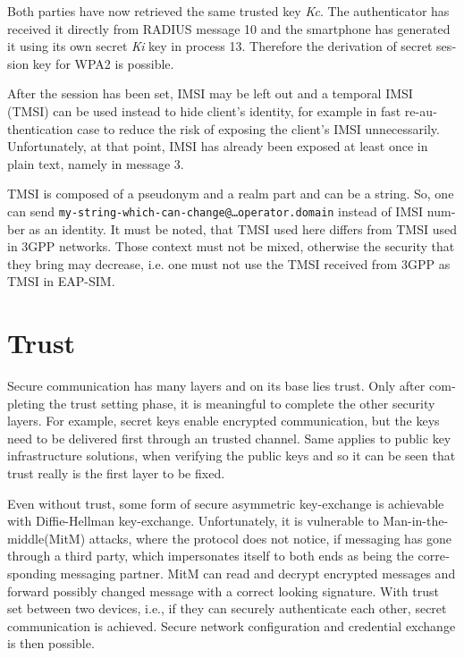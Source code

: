 \documentclass[12pt,a4paper,english]{tutthesis}
\begin{document}
\begin{otherlanguage}{english}
Both parties have now retrieved the same trusted key \emph{Kc}. The
authenticator has received it directly from RADIUS message 10 and the
smartphone has generated it using its own secret \emph{Ki} key in
process 13.
Therefore the derivation of secret session key for WPA2 is possible.

After the session has been set, IMSI may be left out and a temporal IMSI
(TMSI) can be used instead to hide client's identity, for example in
fast re-authentication case to reduce the risk of exposing the client's
IMSI unnecessarily. Unfortunately, at that point, IMSI has already
been exposed at least once in plain text, namely in message 3.

TMSI is composed of a pseudonym and a realm part and can be a
string. So, one can send 
\texttt{my-string-which-can-change@…operator.domain} instead of 
IMSI number as an identity. 
It must be noted, that TMSI used here differs from TMSI used in 3GPP
networks. Those context must not be mixed, otherwise the security that
they bring may decrease, i.e. one must not use the TMSI received from
3GPP as TMSI in EAP-SIM.
\section{Trust}
\label{sec-2-7}

Secure communication has many layers and on its base lies trust. 
Only after completing the trust setting phase, it is meaningful to complete
the other security layers. For example, secret keys enable encrypted
communication, but the keys need to be delivered first through an trusted
channel. Same applies to public key infrastructure solutions, when
verifying the public keys and so it can be seen that trust
really is the first layer to be fixed.



Even without trust, some form of secure asymmetric key-exchange is achievable
with Diffie-Hellman key-exchange\cite{diffie1976new}. Unfortunately, it is vulnerable
to Man-in-the-middle(MitM) attacks, where the protocol does not notice, 
if messaging has gone through a third party, which impersonates itself to 
both ends as being the corresponding messaging partner. MitM can
read and decrypt encrypted messages and forward possibly changed message with
a correct looking signature.
With trust set between two devices, i.e.,  if they can securely
authenticate each other, secret communication is achieved. 
Secure network configuration and credential exchange is then possible.



\end{otherlanguage}
\end{document}
